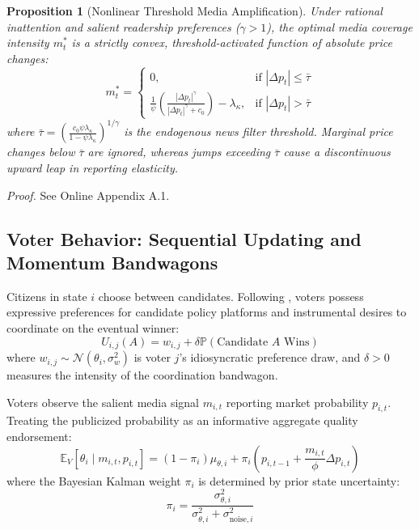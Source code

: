 \documentclass[12pt, a4paper]{article}
\newtheorem{proposition}{Proposition}
\begin{document}
\begin{proposition}[Nonlinear Threshold Media Amplification]
\label{prop:threshold}
Under rational inattention and salient readership preferences ($\gamma > 1$), the optimal media coverage intensity $m_t^*$ is a strictly convex, threshold-activated function of absolute price changes:
\begin{equation}
m_t^* = \begin{cases} 
0, & \text{if } |\Delta p_t| \le \bar{\tau} \\
\frac{1}{\psi} \left( \frac{|\Delta p_t|^\gamma}{|\Delta p_t|^\gamma + c_0} \right) - \lambda_\kappa, & \text{if } |\Delta p_t| > \bar{\tau}
\end{cases}
\end{equation}
where $\bar{\tau} = \left(\frac{c_0 \psi \lambda_\kappa}{1 - \psi \lambda_\kappa}\right)^{1/\gamma}$ is the endogenous news filter threshold. Marginal price changes below $\bar{\tau}$ are ignored, whereas jumps exceeding $\bar{\tau}$ cause a discontinuous upward leap in reporting elasticity.
\end{proposition}
\noindent \textit{Proof.} See Online Appendix A.1.

\subsection{Voter Behavior: Sequential Updating and Momentum Bandwagons}
Citizens in state $i$ choose between candidates. Following \citet{Callander2007}, voters possess expressive preferences for candidate policy platforms and instrumental desires to coordinate on the eventual winner:
\begin{equation}
U_{i,j}(A) = w_{i,j} + \delta \mathbb{P}(\text{Candidate } A \text{ Wins})
\end{equation}
where $w_{i,j} \sim \mathcal{N}(\theta_i, \sigma_{w}^2)$ is voter $j$'s idiosyncratic preference draw, and $\delta > 0$ measures the intensity of the coordination bandwagon.

Voters observe the salient media signal $m_{i,t}$ reporting market probability $p_{i,t}$. Treating the publicized probability as an informative aggregate quality endorsement:
\begin{equation}
\mathbb{E}_V[\theta_i \mid m_{i,t}, p_{i,t}] = (1 - \pi_i) \mu_{\theta, i} + \pi_i \left( p_{i,t-1} + \frac{m_{i,t}}{\phi} \Delta p_{i,t} \right)
\end{equation}
where the Bayesian Kalman weight $\pi_i$ is determined by prior state uncertainty:
\begin{equation}
\pi_i = \frac{\sigma_{\theta, i}^2}{\sigma_{\theta, i}^2 + \sigma_{\text{noise}, i}^2}
\end{equation}
\end{document}
